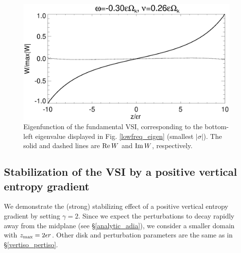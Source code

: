 \begin{figure}
  \includegraphics[width=\linewidth]{figures/eigenvector_iso}
  \caption{Eigenfunction of the fundamental VSI,
    corresponding to the bottom-left eigenvalue displayed in
    Fig. \ref{lowfreq_eigen} (smallest $|\sigma|$). The
    solid and dashed lines are $\operatorname{Re} W$ and $\operatorname{Im} W$, respectively. 
    \label{lowfreq_eigenfunc}
  }
\end{figure}


\subsection{Stabilization of the VSI by a positive vertical entropy
  gradient}
We demonstrate the (strong) stabilizing effect of a  
positive vertical entropy gradient by setting $\gamma=2$.  
Since we expect the perturbations to decay rapidly
away from the midplane (see \S\ref{analytic_adia}), we consider a
smaller domain with $z_\mathrm{max} = 2\epsilon r$. 
Other disk and perturbation parameters are the same as in
\S\ref{vertiso_pertiso}.    



